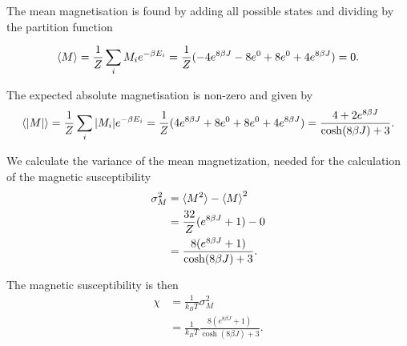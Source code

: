\documentclass[../main.tex]{subfiles}
\begin{document}
The mean magnetisation is found by adding all possible states and dividing by the partition function

\begin{align*}
    \braket{M}=\frac{1}{Z}\sum_iM_ie^{-\beta E_i}=\frac{1}{Z}(-4e^{8\beta J}-8e^0+8e^0+4e^{8\beta J}) = 0.
\end{align*}

The expected absolute magnetisation is non-zero and given by
\begin{align*}
    \braket{|M|}=\frac{1}{Z}\sum_i|M_i|e^{-\beta E_i}=\frac{1}{Z}(4e^{8\beta J}+8e^0+8e^0+4e^{8\beta J})=\frac{4+2e^{8\beta J}}{\cosh(8\beta J) + 3}.
\end{align*}

We calculate the variance of the mean magnetization, needed for the calculation of the magnetic susceptibility
\begin{align*}
    \sigma_M^2&=\braket{M^2}-\braket{M}^2 \\
    &=\frac{32}{Z}(e^{8\beta J}+1)-0 \\
    &=\frac{8(e^{8\beta J}+1)}{\cosh(8\beta J)+3}.
\end{align*}

The magnetic susceptibility is then
\begin{align*}
    \chi&=\frac{1}{k_BT}\sigma_M^2 \\
    &= \frac{1}{k_BT}\frac{8(e^{8\beta J}+1)}{\cosh(8\beta J)+3}. 
\end{align*}
\end{document}
